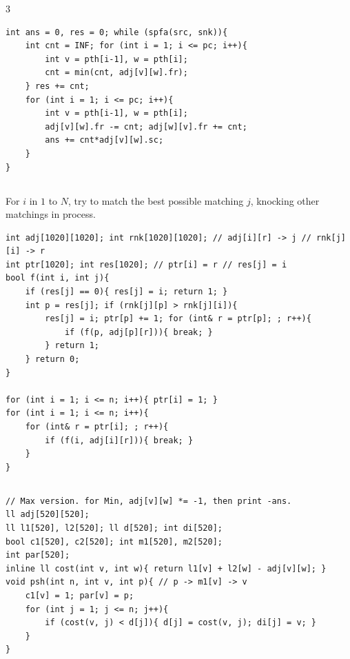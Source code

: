 \documentclass[landscape, 8pt, a4paper, oneside]{extarticle}
\begin{document}
\begin{multicols*}{3}
\begin{verbatim}
int ans = 0, res = 0; while (spfa(src, snk)){
	int cnt = INF; for (int i = 1; i <= pc; i++){
		int v = pth[i-1], w = pth[i];
		cnt = min(cnt, adj[v][w].fr);
	} res += cnt;
	for (int i = 1; i <= pc; i++){
		int v = pth[i-1], w = pth[i];
		adj[v][w].fr -= cnt; adj[w][v].fr += cnt;
		ans += cnt*adj[v][w].sc;
	}
}
\end{verbatim}
\subsection{}
For $i$ in $1$ to $N$, try to match the best possible matching $j$, knocking other matchings in process.

\begin{verbatim}
int adj[1020][1020]; int rnk[1020][1020]; // adj[i][r] -> j // rnk[j][i] -> r
int ptr[1020]; int res[1020]; // ptr[i] = r // res[j] = i
bool f(int i, int j){
	if (res[j] == 0){ res[j] = i; return 1; }
	int p = res[j]; if (rnk[j][p] > rnk[j][i]){
		res[j] = i; ptr[p] += 1; for (int& r = ptr[p]; ; r++){
			if (f(p, adj[p][r])){ break; }
		} return 1;
	} return 0;
}

for (int i = 1; i <= n; i++){ ptr[i] = 1; }
for (int i = 1; i <= n; i++){
	for (int& r = ptr[i]; ; r++){
		if (f(i, adj[i][r])){ break; }
	}
}
\end{verbatim}
\subsection{}
\begin{verbatim}
// Max version. for Min, adj[v][w] *= -1, then print -ans.
ll adj[520][520];
ll l1[520], l2[520]; ll d[520]; int di[520];
bool c1[520], c2[520]; int m1[520], m2[520];
int par[520];
inline ll cost(int v, int w){ return l1[v] + l2[w] - adj[v][w]; }
void psh(int n, int v, int p){ // p -> m1[v] -> v
	c1[v] = 1; par[v] = p;
	for (int j = 1; j <= n; j++){
		if (cost(v, j) < d[j]){ d[j] = cost(v, j); di[j] = v; }
	}
}


\end{verbatim}
\end{multicols*}
\end{document}
